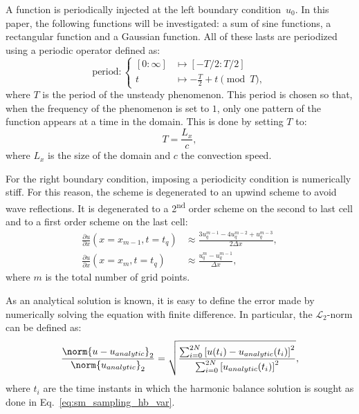 A function is periodically injected at the left boundary
condition~$u_0$.
In this paper, the following functions will be
investigated: a sum of sine functions, a rectangular
function and a Gaussian function. All of these lasts are periodized
using a periodic operator defined as:
\begin{equation}
    \text{period} \colon
    \begin{cases}
        [0: \infty] & \longmapsto[-T/2: T/2]\\
        t & \longmapsto \displaystyle - \frac{T}{2} + t \pmod T,
    \end{cases}
    \label{eq:periodic_operator}
\end{equation}
where $T$ is the period of the unsteady phenomenon. This period 
is chosen so that, when the frequency of the 
phenomenon is set to $1$, only one pattern of the function 
appears at a time in the domain.
This is done by setting $T$ to:
\begin{equation}
   T = \frac{L_x}{c},
   \label{eq:time_spatial_correspondence}
\end{equation}
where $L_x$ is the size of the domain and $c$ the convection speed.

For the right boundary condition, imposing a periodicity condition is
numerically stiff. For this reason, the scheme is degenerated 
to an upwind scheme to avoid wave reflections. It is degenerated to
a 2\textsuperscript{nd} order scheme on the second to last cell
and to a first order scheme on the last cell:
\begin{align}
    \frac{\partial u}{\partial x} (x = x_{m-1}, t=t_q) &\approx 
    \frac{3 u^{m-1}_{q} - 4 u^{m-2}_{q} + u^{m-3}_{q}}{2\Delta x}, \\
    \frac{\partial u}{\partial x} (x = x_m, t=t_q) &\approx 
    \frac{u^{m}_{q} - u^{m-1}_{q}}{\Delta x},
\label{eq:upwind_scheme}
\end{align}
where $m$ is the total number of grid points.

As an analytical solution is known, it is easy to define the error
made by numerically solving the equation with finite difference.
In particular, the $\mathcal{L}_2$-norm can be defined as:
\begin{equation}
    \frac{\norm{u-u_{analytic}}_2}{\norm{u_{analytic}}_2} = 
    \sqrt{\frac{\sum_{i=0}^{2N} \left[u(t_i) - u_{analytic}(t_i)  \right]^2}{
    \sum_{i=0}^{2N} \left[u_{analytic}(t_i)\right]^2}},
    \label{eq:l2_norm}
\end{equation}
where $t_i$ are the time instants
in which the harmonic balance solution is sought as 
done in Eq.~\eqref{eq:sm_sampling_hb_var}.
